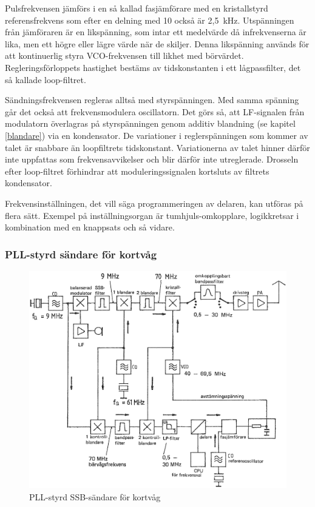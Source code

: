 Pulsfrekvensen jämförs i en så kallad fasjämförare med en kristallstyrd
referensfrekvens som efter en delning med 10 också är 2,5~kHz.
Utspänningen från jämföraren är en likspänning, som intar ett
medelvärde då infrekvenserna är lika, men ett högre eller lägre värde
när de skiljer.
Denna likspänning används för att kontinuerlig styra VCO-frekvensen
till likhet med börvärdet.
Regleringsförloppets hastighet bestäms av tidskonstanten i ett
lågpassfilter, det så kallade loop-filtret.

Sändningsfrekvensen regleras alltså med styrspänningen.
Med samma spänning går det också att frekvensmodulera oscillatorn.
Det görs så, att LF-signalen från modulatorn överlagras på styrspänningen genom
additiv blandning (se kapitel \ref{blandare}) via en kondensator.
De variationer i reglerspänningen som kommer av talet är snabbare än
loopfiltrets tidskonstant.
Variationerna av talet hinner därför inte uppfattas som frekvensavvikelser och
blir därför inte utreglerade.
Drosseln efter loop-filtret förhindrar att moduleringssignalen
kortsluts av filtrets kondensator.

Frekvensinställningen, det vill säga programmeringen av delaren, kan utföras
på flera sätt. Exempel på inställningsorgan är tumhjuls-omkopplare,
logikkretsar i kombination med en knappsats och så vidare.

\subsubsection{PLL-styrd sändare för kortvåg}

\begin{figure}
  \includegraphics[width=\textwidth]{images/cropped_pdfs/bild_2_5-08.pdf}
  \caption{PLL-styrd SSB-sändare för kortvåg}
  \label{fig:bildII5-8}
\end{figure}

